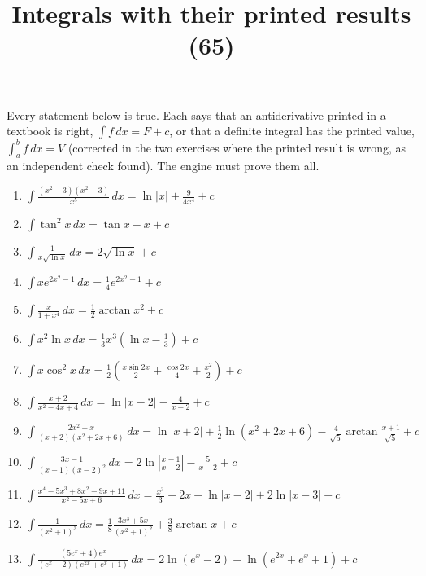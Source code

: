 \documentclass[11pt,a4paper]{article}
\title{Integrals with their printed results (65)}
\author{}
\date{}
\begin{document}
\maketitle
Every statement below is true. Each says that an antiderivative printed in a textbook is right, $\int f \, dx = F + c$, or that a definite integral has the printed value, $\int_{a}^{b} f \, dx = V$ (corrected in the two exercises where the printed result is wrong, as an independent check found). The engine must prove them all.

\begin{enumerate}
\item $\displaystyle \int \frac{\left(x^{2} - 3\right)\left(x^{2} + 3\right)}{x^{5}} \, dx = \ln|x| + \frac{9}{4x^{4}} + c$
\item $\displaystyle \int \tan^{2} x \, dx = \tan x - x + c$
\item $\displaystyle \int \frac{1}{x\sqrt{\ln x}} \, dx = 2\sqrt{\ln x} + c$
\item $\displaystyle \int x e^{2x^{2} - 1} \, dx = \frac{1}{4}e^{2x^{2} - 1} + c$
\item $\displaystyle \int \frac{x}{1 + x^{4}} \, dx = \frac{1}{2}\arctan x^{2} + c$
\item $\displaystyle \int x^{2}\ln x \, dx = \frac{1}{3}x^{3}\left(\ln x - \frac{1}{3}\right) + c$
\item $\displaystyle \int x\cos^{2} x \, dx = \frac{1}{2}\left(\frac{x\sin 2x}{2} + \frac{\cos 2x}{4} + \frac{x^{2}}{2}\right) + c$
\item $\displaystyle \int \frac{x + 2}{x^{2} - 4x + 4} \, dx = \ln|x - 2| - \frac{4}{x - 2} + c$
\item $\displaystyle \int \frac{2x^{2} + x}{(x + 2)\left(x^{2} + 2x + 6\right)} \, dx = \ln|x + 2| + \frac{1}{2}\ln\left(x^{2} + 2x + 6\right) - \frac{4}{\sqrt{5}}\arctan\frac{x + 1}{\sqrt{5}} + c$
\item $\displaystyle \int \frac{3x - 1}{(x - 1)(x - 2)^{2}} \, dx = 2\ln\left|\frac{x - 1}{x - 2}\right| - \frac{5}{x - 2} + c$
\item $\displaystyle \int \frac{x^{4} - 5x^{3} + 8x^{2} - 9x + 11}{x^{2} - 5x + 6} \, dx = \frac{x^{3}}{3} + 2x - \ln|x - 2| + 2\ln|x - 3| + c$
\item $\displaystyle \int \frac{1}{\left(x^{2} + 1\right)^{3}} \, dx = \frac{1}{8}\frac{3x^{3} + 5x}{\left(x^{2} + 1\right)^{2}} + \frac{3}{8}\arctan x + c$
\item $\displaystyle \int \frac{\left(5e^{x} + 4\right)e^{x}}{\left(e^{x} - 2\right)\left(e^{2x} + e^{x} + 1\right)} \, dx = 2\ln\left(e^{x} - 2\right) - \ln\left(e^{2x} + e^{x} + 1\right) + c$

\end{enumerate}
\end{document}

